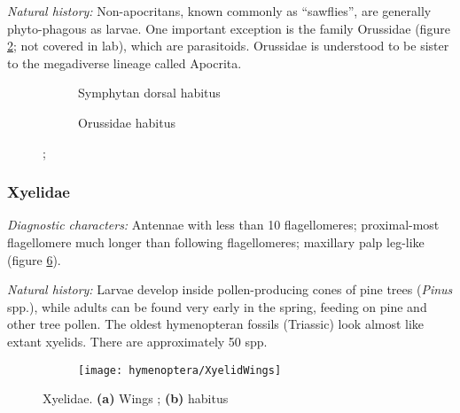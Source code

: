 \noindent{}\textit{Natural history:} Non-apocritans, known commonly as ``sawflies'', are generally phyto-phagous as larvae. One important exception is the family Orussidae (figure \ref{fig:orussid1}; not covered in lab), which are parasitoids. Orussidae is understood to be sister to the megadiverse lineage called Apocrita.

\begin{figure}[ht!]
    \centering
    \begin{subfigure}[ht!]{0.47\textwidth}
        \caption{Symphytan dorsal habitus}
        \label{fig:symphyt1}
    \end{subfigure}
    \hfill 
    \begin{subfigure}[ht!]{0.45\textwidth}
        \caption{Orussidae habitus}
        \label{fig:orussid1}
    \end{subfigure}
    \caption{\citep[][Pg. 42, Fig. 24]{goulet1993hymenoptera}; }\label{fig:symphytans}
\end{figure}

\subsubsection{Xyelidae}
\noindent{}\textit{Diagnostic characters:} Antennae with less than 10 flagellomeres; proximal-most flagellomere much longer than following flagellomeres; maxillary palp leg-like (figure \ref{fig:xyelids}).\vspace{3mm}

\noindent{}\textit{Natural history:} Larvae develop inside pollen-producing cones of pine trees (\textit{Pinus} spp.), while adults can be found very early in the spring, feeding on pine and other tree pollen. The oldest hymenopteran fossils (Triassic) look almost like extant xyelids. There are approximately 50 spp.

\begin{figure}[ht!]
    \centering
    \begin{subfigure}[ht!]{0.4\textwidth}
        \texttt{[image: hymenoptera/XyelidWings]}
        \caption{}
        \label{fig:xyelidwings}
    \end{subfigure}
    \hfill 
    \begin{subfigure}[ht!]{0.42\textwidth}
        \caption{}
        \label{fig:xyelidhead}
    \end{subfigure}
    \caption{Xyelidae. \textbf{(a)} Wings \citep[][modified from Fig. 32]{goulet1993hymenoptera}; \textbf{(b)} habitus \citep[][Fig. 32]{goulet1993hymenoptera}}\label{fig:xyelids}
\end{figure}

